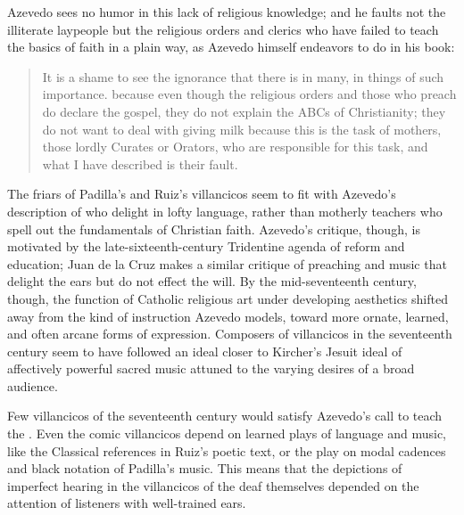 Azevedo sees no humor in this lack of religious knowledge; and he faults not 
the illiterate laypeople but the religious orders and clerics who have failed 
to teach the basics of faith in a plain way, as Azevedo himself endeavors to do 
in his book:
\begin{quote}
    It is a shame to see the ignorance that there is in many, in things of such 
    importance.
    \Dots{} because even though the religious orders and those who preach do 
    declare the gospel, 
    they do not explain the ABCs  of Christianity;
    they do not want to deal with giving milk because this is the task of 
    mothers, those lordly Curates or Orators, who are responsible for this task, 
    and what I have described is their fault.%
        \Autocite
        [27: ] 
        {Azevedo:Catecismo}
\end{quote}

The friars of Padilla's and Ruiz's villancicos seem to fit with Azevedo's 
description of  who delight in lofty language, rather 
than motherly teachers who spell out the fundamentals of Christian faith.
Azevedo's critique, though, is motivated by the late-sixteenth-century 
Tridentine agenda of reform and education; Juan de la Cruz makes a similar
critique of preaching and music that delight the ears but do not effect the
will.
By the mid-seventeenth century, though, the function of Catholic religious art
under developing  aesthetics shifted away from the kind of
 instruction Azevedo models, toward more ornate, learned, and
often arcane forms of expression.
Composers of villancicos in the seventeenth century seem to have followed an
ideal closer to Kircher's Jesuit ideal of affectively powerful sacred music
attuned to the varying desires of a broad audience.

Few villancicos of the seventeenth century would satisfy Azevedo's call to 
teach the .
Even the comic villancicos depend on learned plays of language and music, like 
the Classical references in Ruiz's poetic text, or the play on modal cadences 
and black notation of Padilla's music.
This means that the depictions of imperfect hearing in the villancicos of the 
deaf themselves depended on the attention of listeners with well-trained ears.

